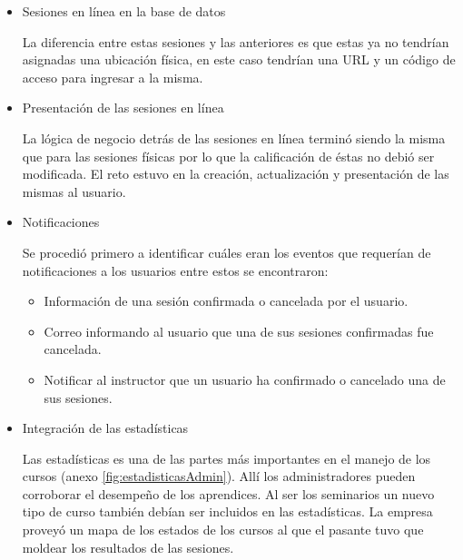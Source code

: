 \begin{itemize}

\item Sesiones en línea en la base de datos

La diferencia entre estas sesiones y las anteriores es que estas ya no tendrían asignadas una ubicación física, en este caso tendrían una \gls{URL} y un código de acceso para ingresar a la misma. 

\item Presentación de las sesiones en línea

La lógica de negocio detrás de las sesiones en línea terminó siendo la misma que para las sesiones físicas por lo que la calificación de éstas no debió ser modificada. El reto estuvo en la creación, actualización y presentación de las mismas al usuario.

\item Notificaciones

Se procedió primero a identificar cuáles eran los eventos que requerían de notificaciones a los usuarios entre estos se encontraron:

\begin{itemize}
	\item Información de una sesión confirmada o cancelada por el usuario.
	\item Correo informando al usuario que una de sus sesiones confirmadas fue cancelada.
	\item Notificar al instructor que un usuario ha confirmado o cancelado una de sus sesiones.
\end{itemize}

\item Integración de las estadísticas

Las estadísticas es una de las partes más importantes en el manejo de los cursos (anexo \ref{fig:estadisticasAdmin}). Allí los administradores pueden corroborar el desempeño de los aprendices. Al ser los seminarios un nuevo tipo de curso también debían ser incluidos en las estadísticas. La empresa proveyó un mapa de los estados de los cursos al que el pasante tuvo que moldear los resultados de las sesiones. 

\end{itemize}


